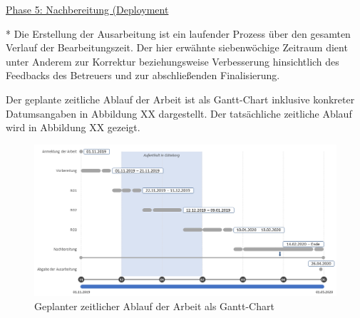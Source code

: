 \underline{Phase 5: Nachbereitung (Deployment}
\begin{table}[H]
\label{tab:phase5}
\end{table}

* Die Erstellung der Ausarbeitung ist ein laufender Prozess über den gesamten Verlauf der Bearbeitungszeit. Der hier erwähnte siebenwöchige Zeitraum dient unter Anderem zur Korrektur beziehungsweise Verbesserung hinsichtlich des Feedbacks des Betreuers und zur abschließenden Finalisierung.

Der geplante zeitliche Ablauf der Arbeit ist als Gantt-Chart inklusive konkreter Datumsangaben in Abbildung XX dargestellt. Der tatsächliche zeitliche Ablauf wird in Abbildung XX gezeigt.

\begin{figure}[H]
    \centering
    \includegraphics[width=\textwidth]{images/Zeit}
    \caption{Geplanter zeitlicher Ablauf der Arbeit als Gantt-Chart}\label{fig:zeit}
\end{figure}

